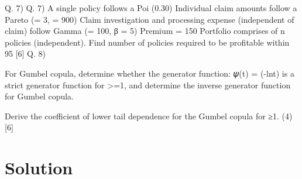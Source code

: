 \documentclass[a4paper,12pt]{article}
\begin{document}


Q. 7)
Q. 7)
A single policy follows a Poi (0.30)
Individual claim amounts follow a Pareto (\alpha = 3, \lambda = 900)
Claim investigation and processing expense (independent of claim) follow Gamma (\alpha = 100, β = 5)
Premium = 150
Portfolio comprises of n policies (independent).
Find number of policies required to be profitable within 95%
[6]
Q. 8)
\item  For Gumbel copula, determine whether the generator function:
𝜓(t) = (-lnt) \alpha
is a strict generator function for \alpha >=1, and determine the inverse generator function for Gumbel copula.

\item   Derive the coefficient of lower tail dependence for the Gumbel copula for \alpha≥1.
(4)
[6]


\section*{Solution}
\end{document}
